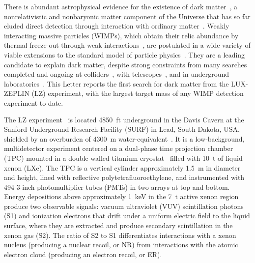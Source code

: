 

There is abundant astrophysical evidence for the existence of dark matter~\cite{Aghanim2020, SofueRubin, harvey2015nongravitational, ARBEY2021103865}, a nonrelativistic and nonbaryonic matter component of the Universe that has so far eluded direct detection through interaction with ordinary matter~\cite{schumann2019direct}. Weakly interacting massive particles (WIMPs), which obtain their relic abundance by thermal freeze-out through weak interactions~\cite{Lee1977ua}, are postulated in a wide variety of viable extensions to the standard model of particle physics~\cite{RevModPhys.90.045002, Billard2022,akerib2022snowmass2021}. They are a leading candidate to explain dark matter, despite strong constraints from many searches completed and ongoing at colliders~\cite{aaboud2018search, sirunyan2018search, aaboud2018searchz, sirunyan2018searchz, universe4110131}, with telescopes~\cite{abe2020indirect,choi2015search, abbasi2022search, albert2017results,  cuoco2017novel, cui2017possible, Albert_2017}, and in underground laboratories~\cite{abdelhameed2019first, agnes2018low,amole2019dark,collaboration2018dark, PhysRevLett.127.261802,deapcollaborationSearchDarkMatter2019, akerib2017results, Agnese:2015ywx}. 
This Letter reports the first search for dark matter from the LUX-ZEPLIN (LZ) experiment, with the largest target mass of any WIMP detection experiment to date.

The LZ experiment~\cite{LZExperiment, lztdr} is located \SI{4850}{ft} underground in the Davis Cavern at the Sanford Underground Research Facility (SURF) in Lead, South Dakota, USA, shielded by an overburden of \SI{4300}{m} water-equivalent~\cite{Heise:2021eym}. It is a low-background, multidetector experiment centered on a dual-phase time projection chamber (TPC) mounted in a double-walled titanium cryostat~\cite{AKERIB20171} filled with \SI{10}{t} of liquid xenon (LXe). The TPC is a vertical cylinder approximately \SI{1.5}{m} in diameter and height, lined with reflective polytetrafluoroethylene, and instrumented with 494 3{\nobreakdash-}inch photomultiplier tubes (PMTs) in two arrays at top and bottom. Energy depositions above approximately \SI{1}{keV} in the \SI{7}{t} active xenon region produce two observable signals: vacuum ultraviolet (VUV) scintillation photons (S1) and ionization electrons that drift under a uniform electric field to the liquid surface, where they are extracted and produce secondary scintillation in the xenon gas (S2). The ratio of S2 to S1 differentiates interactions with a xenon nucleus (producing a nuclear recoil, or NR) from interactions with the atomic electron cloud (producing an electron recoil, or ER). 
 
